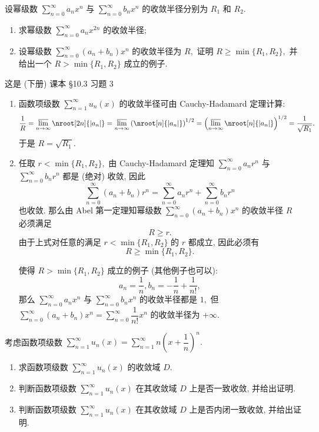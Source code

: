 \begin{question}[points = 10]
  设幂级数 $\sum\limits_{n=0}^\infty a_n x^n$ 与 $\sum\limits_{n=0}^\infty b_n x^n$ 的收敛半径分别为 $R_1$ 和 $R_2.$
  \begin{enumerate}
    \item 求幂级数 $\sum\limits_{n=0}^\infty a_n x^{2n}$ 的收敛半径;
    \item 设幂级数 $\sum\limits_{n=0}^\infty (a_n + b_n) x^n$ 的收敛半径为 $R,$ 证明 $R \geqslant \min\{R_1, R_2\},$ 并给出一个 $R > \min\{R_1, R_2\}$ 成立的例子.
  \end{enumerate}

\end{question}

\begin{solution}
  这是 (下册) 课本 \S 10.3 习题 3

  \begin{enumerate}
    \item 函数项级数 $\sum\limits_{n=1}^{\infty} u_n(x)$ 的收敛半径可由 Cauchy-Hadamard 定理计算:
    $$\dfrac{1}{R} = \varlimsup_{n\to\infty} \nroot[2n]{\lvert a_{n} \rvert} = \varlimsup_{n\to\infty} \left( \nroot[n]{\lvert a_{n} \rvert} \right)^{1/2} = \left( \varlimsup_{n\to\infty} \nroot[n]{\lvert a_{n} \rvert} \right)^{1/2} = \dfrac{1}{\sqrt{R_1}}.$$
    于是 $R = \sqrt{R_1}.$
    \item 任取 $r < \min\{R_1, R_2\},$ 由 Cauchy-Hadamard 定理知 $\sum\limits_{n=0}^\infty a_n r^n$ 与 $\sum\limits_{n=0}^\infty b_n r^n$ 都是 (绝对) 收敛, 因此
    $$\sum\limits_{n=0}^\infty (a_n + b_n) r^n = \sum\limits_{n=0}^\infty a_n r^n + \sum\limits_{n=0}^\infty b_n r^n$$
    也收敛. 那么由 Abel 第一定理知幂级数 $\sum\limits_{n=0}^\infty (a_n + b_n) x^n$ 的收敛半径 $R$ 必须满足
    $$R \geqslant r.$$
    由于上式对任意的满足 $r < \min\{R_1, R_2\}$ 的 $r$ 都成立, 因此必须有 $$R \geqslant \min\{R_1, R_2\}.$$

    使得 $R > \min\{R_1, R_2\}$ 成立的例子 (其他例子也可以):
    $$a_n = \dfrac{1}{n}, b_n = -\dfrac{1}{n} + \dfrac{1}{n!},$$
    那么 $\sum\limits_{n=0}^\infty a_n x^n$ 与 $\sum\limits_{n=0}^\infty b_n x^n$ 的收敛半径都是 $1,$ 但 $\sum\limits_{n=0}^\infty (a_n + b_n) x^n = \sum\limits_{n=0}^\infty \dfrac{1}{n!} x^n$ 的收敛半径为 $+\infty.$
  \end{enumerate}
\end{solution}

\begin{question}[points = 10]
  考虑函数项级数 $\sum\limits_{n=1}^{\infty} u_n(x) = \sum\limits_{n=1}^{\infty} n \left( x + \dfrac{1}{n} \right)^n.$
  \begin{enumerate}
    \item 求函数项级数 $\sum\limits_{n=1}^{\infty} u_n(x)$ 的收敛域 $D.$
    \item 判断函数项级数 $\sum\limits_{n=1}^{\infty} u_n(x)$ 在其收敛域 $D$ 上是否一致收敛, 并给出证明.
    \item 判断函数项级数 $\sum\limits_{n=1}^{\infty} u_n(x)$ 在其收敛域 $D$ 上是否内闭一致收敛, 并给出证明.
  \end{enumerate}

\end{question}

